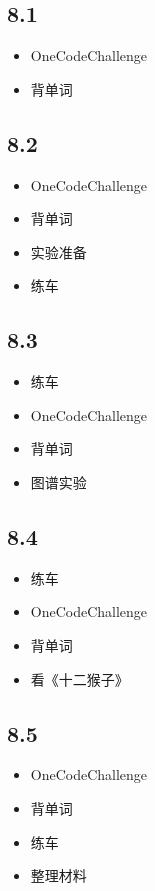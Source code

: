 \documentclass[UTF8]{ctexart}
\begin{document}
\subsection*{8.1}
\begin{itemize}
    \item OneCodeChallenge
    \item 背单词
\end{itemize}

\subsection*{8.2}
\begin{itemize}
    \item OneCodeChallenge
    \item 背单词
    \item 实验准备
    \item 练车
\end{itemize}

\subsection*{8.3}
\begin{itemize}
    \item 练车
    \item OneCodeChallenge
    \item 背单词
    \item 图谱实验
\end{itemize}

\subsection*{8.4}
\begin{itemize}
    \item 练车
    \item OneCodeChallenge
    \item 背单词
    \item 看《十二猴子》
\end{itemize}

\subsection*{8.5}
\begin{itemize}
    \item OneCodeChallenge
    \item 背单词
    \item 练车
    \item 整理材料
\end{itemize}
\end{document}
